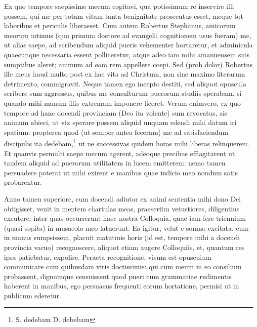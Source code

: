 \documentclass{article}
\begin{document}
Ex quo tempore saepissime mecum cogitavi, qua potissimum re inservire illi possem, qui me per totam vitam tanta benignitate prosecutus esset, meque tot laboribus et periculis liberasset. Cum autem Robertus Stephanus, amicorum meorum intimus (quo primum doctore ad evangelii cognitionem usus fueram) me, ut alias saepe, ad scribendum aliquid pueris vehementer hortaretur, et adminicula quaecunque necessaria essent polliceretur, atque adeo iam mihi amanuensem suis sumptibus aleret; animum ad eam rem appellere coepi. Sed (proh dolor) Robertus ille meus haud multo post ex hac vita ad Christum, non sine maximo literarum detrimento, commigravit. Neque tamen ego incepto destiti, sed aliquot opuscula scribere sum aggressus, quibus me consulturum puerorum studiis sperabam, si quando mihi manum illis extremam imponere liceret. Verum enimvero, ex quo tempore ad hanc docendi provinciam (Deo ita volente) sum revocatus, sic animum abieci, ut vix sperare possem aliquid unquam edendi mihi datum iri spatium: propterea quod (ut semper antea feceram) me ad satisfaciendum discipulis ita dedebam,\footnote{S. dedebam D. debebam} ut ne successivas quidem horas mihi liberas relinquerem. Et quanvis permulti saepe mecum agerent, adeoque precibus efflagitarent ut tandem aliquid ad puerorum utilitatem in lucem emitterem: nemo tamen persuadere poterat ut mihi exirent e manibus quae iudicio meo nondum satis probarentur.

Anno tamen superiore, cum docendi adiutor ex animi sententia mihi dono Dei obtigisset, venit in mentem chartulas meas, praesertim vetustiores, diligentius excutere: inter quas occurrerunt haec nostra Colloquia, quae iam fere triennium (quasi sopita) in musaeolo meo latuerunt. Ea igitur, velut e somno excitata, cum in manus sumpsissem, placuit matutinis horis (id est, tempore mihi a docendi provincia vacuo) recognoscere, aliquot etiam augere Colloquiis, et, quantum res ipsa patiebatur, expolire. Peracta recognitione, visum est opusculum communicare cum quibusdam viris doctissimis: qui cum meum in eo consilium probassent, dignumque censuissent quod pueri cum grammatiae rudimentis haberent in manibus, ego persuasus frequenti eorum hortatione, permisi ut in publicum ederetur.
\end{document}
